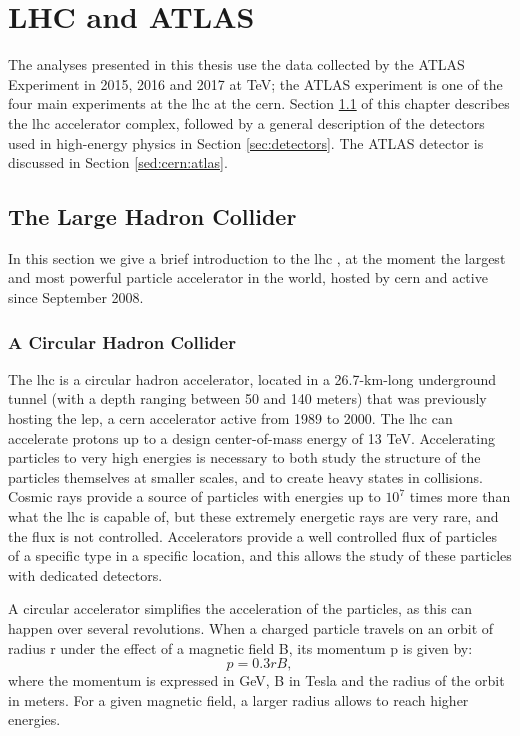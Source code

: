 \chapter{LHC and ATLAS}
\label{chap:cern}

The analyses presented in this thesis use the data collected by the ATLAS Experiment in 2015, 2016 and 2017 at \cmtre TeV; the ATLAS experiment is one of the four main experiments at the \gls{lhc} at the \gls{cern}. Section \ref{sed:cern:lhc} of this chapter describes the \gls{lhc} accelerator complex, followed by a general description of the detectors used in high-energy physics in Section \ref{sec:detectors}. The ATLAS detector is discussed in Section \ref{sed:cern:atlas}.


\section{The Large Hadron Collider}
\label{sed:cern:lhc}

In this section we give a brief introduction to the \gls{lhc} \cite{1748-0221-3-08-S08001}, at the moment the largest and most powerful particle accelerator in the world, hosted by \gls{cern} and active since September 2008.


\subsection{A Circular Hadron Collider}

The \gls{lhc} is a circular hadron accelerator, located in a 26.7-km-long underground tunnel (with a depth ranging between 50 and 140 meters) that was previously hosting the \gls{lep}, a \gls{cern} accelerator active from 1989 to 2000. The \gls{lhc} can accelerate protons up to a design center-of-mass energy of 13 TeV. Accelerating particles to very high energies is necessary to both study the structure of the particles themselves at smaller scales, and to create heavy states in collisions. Cosmic rays provide a source of particles with energies up to $10^7$ times more than what the \gls{lhc} is capable of, but these extremely energetic rays are very rare, and the flux is not controlled. Accelerators provide a well controlled flux of particles of a specific type in a specific location, and this allows the study of these particles with dedicated detectors.

A circular accelerator simplifies the acceleration of the particles, as this can happen over several revolutions. When a charged particle travels on an orbit of radius r under the effect of a magnetic field B, its momentum p is given by:
\begin{equation}
\label{eq:cern:p03br}
p = 0.3 r B,
\end{equation}
\noindent where the momentum is expressed in GeV, B in Tesla and the radius of the orbit in meters. For a given magnetic field, a larger radius allows to reach higher energies. 

